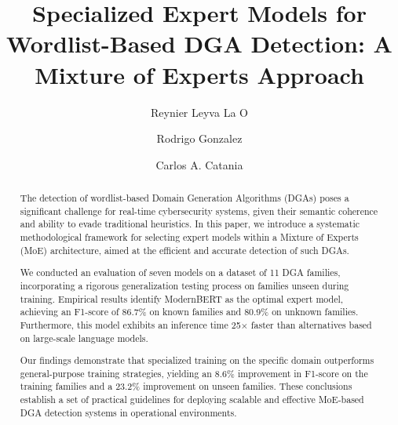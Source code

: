\documentclass[a4paper]{llncs}
\begin{document}
\title{Specialized Expert Models for Wordlist-Based DGA Detection: A Mixture of Experts Approach}

\author{
Reynier Leyva La O  \and  Rodrigo Gonzalez  \and Carlos A. Catania
}



\maketitle

\begin{abstract}


The detection of wordlist-based Domain Generation Algorithms (DGAs) poses a significant challenge for real-time cybersecurity systems, given their semantic coherence and ability to evade traditional heuristics. In this paper, we introduce a systematic methodological framework for selecting expert models within a Mixture of Experts (MoE) architecture, aimed at the efficient and accurate detection of such DGAs.

We conducted an evaluation of seven models on a dataset of 11 DGA families, incorporating a rigorous generalization testing process on families unseen during training. Empirical results identify ModernBERT as the optimal expert model, achieving an F1-score of 86.7\% on known families and 80.9\% on unknown families. Furthermore, this model exhibits an inference time 25× faster than alternatives based on large-scale language models.

Our findings demonstrate that specialized training on the specific domain outperforms general-purpose training strategies, yielding an 8.6\% improvement in F1-score on the training families and a 23.2\% improvement on unseen families. These conclusions establish a set of practical guidelines for deploying scalable and effective MoE-based DGA detection systems in operational environments.



\end{abstract}
\end{document}
